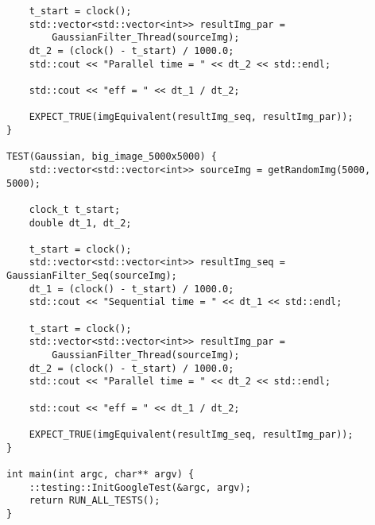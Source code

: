 \documentclass{report}
\begin{document}
\begin{lstlisting}
    t_start = clock();
    std::vector<std::vector<int>> resultImg_par =
        GaussianFilter_Thread(sourceImg);
    dt_2 = (clock() - t_start) / 1000.0;
    std::cout << "Parallel time = " << dt_2 << std::endl;

    std::cout << "eff = " << dt_1 / dt_2;

    EXPECT_TRUE(imgEquivalent(resultImg_seq, resultImg_par));
}

TEST(Gaussian, big_image_5000x5000) {
    std::vector<std::vector<int>> sourceImg = getRandomImg(5000, 5000);

    clock_t t_start;
    double dt_1, dt_2;

    t_start = clock();
    std::vector<std::vector<int>> resultImg_seq = GaussianFilter_Seq(sourceImg);
    dt_1 = (clock() - t_start) / 1000.0;
    std::cout << "Sequential time = " << dt_1 << std::endl;

    t_start = clock();
    std::vector<std::vector<int>> resultImg_par =
        GaussianFilter_Thread(sourceImg);
    dt_2 = (clock() - t_start) / 1000.0;
    std::cout << "Parallel time = " << dt_2 << std::endl;

    std::cout << "eff = " << dt_1 / dt_2;

    EXPECT_TRUE(imgEquivalent(resultImg_seq, resultImg_par));
}

int main(int argc, char** argv) {
    ::testing::InitGoogleTest(&argc, argv);
    return RUN_ALL_TESTS();
}
\end{lstlisting}
\end{document}
